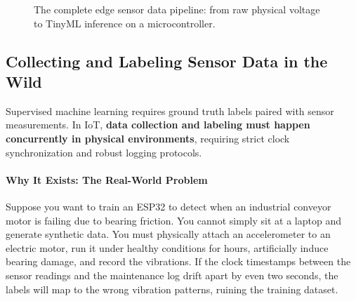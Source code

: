 \begin{figure}[htbp]
\centering
{}
\caption{The complete edge sensor data pipeline: from raw physical voltage to TinyML inference on a microcontroller.}\label{fig:edge_pipeline}
\end{figure}

\subsection{Collecting and Labeling Sensor Data in the Wild}

\begin{keyidea}
Supervised machine learning requires ground truth labels paired with sensor measurements. In IoT, \textbf{data collection and labeling must happen concurrently in physical environments}, requiring strict clock synchronization and robust logging protocols.
\end{keyidea}

\paragraph{Why It Exists: The Real-World Problem}
Suppose you want to train an ESP32 to detect when an industrial conveyor motor is failing due to bearing friction. You cannot simply sit at a laptop and generate synthetic data. You must physically attach an accelerometer to an electric motor, run it under healthy conditions for hours, artificially induce bearing damage, and record the vibrations. If the clock timestamps between the sensor readings and the maintenance log drift apart by even two seconds, the labels will map to the wrong vibration patterns, ruining the training dataset.


